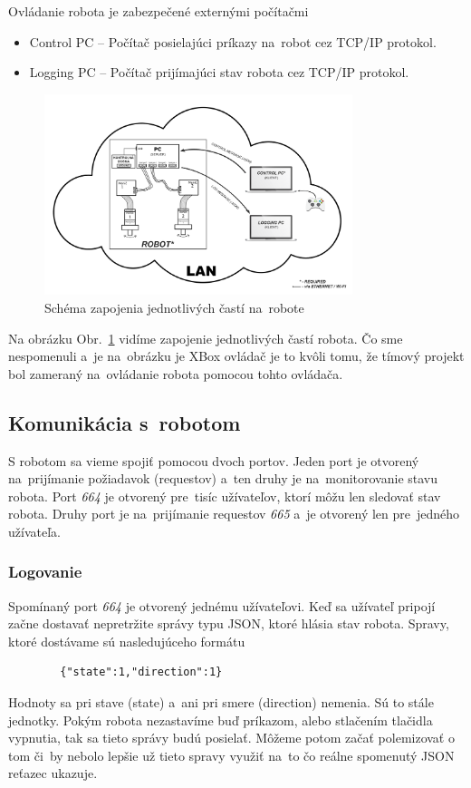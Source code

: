 \noindent Ovládanie robota je zabezpečené externými počítačmi
\begin{itemize}
	\item Control PC -- Počítač posielajúci príkazy na~robot cez TCP/IP protokol.
	\item Logging PC -- Počítač prijímajúci stav robota cez TCP/IP protokol.
\end{itemize}

\begin{figure}[!htbp]
	\begin{center}
		\includegraphics[width=9cm]{img/schemaRobota.png}
	\end{center}
	\caption{Schéma zapojenia jednotlivých častí na~robote}
	\label{fig:schemaRobota}
\end{figure}

Na obrázku Obr.~\ref{fig:schemaRobota} vidíme zapojenie jednotlivých častí robota. Čo sme nespomenuli a~je na~obrázku je XBox ovládač je to kvôli tomu, že
tímový projekt bol zameraný na~ovládanie robota pomocou tohto ovládača.

\subsection{Komunikácia s~robotom}

S robotom sa vieme spojiť pomocou dvoch portov. Jeden port je otvorený na~prijímanie požiadavok (requestov) a~ten druhy je na~monitorovanie stavu robota. 
Port \textit{664} je otvorený pre~tisíc užívateľov, ktorí môžu len sledovať stav robota. Druhy port je na~prijímanie requestov \textit{665} a~je otvorený
len pre~jedného užívateľa.

\subsubsection{Logovanie}

Spomínaný port \textit{664} je otvorený jednému užívateľovi. Keď sa užívateľ pripojí začne dostavať nepretržite správy typu JSON, ktoré hlásia stav robota. Spravy,
ktoré dostávame sú nasledujúceho formátu
\begin{lstlisting}
		{"state":1,"direction":1}
\end{lstlisting}
Hodnoty sa pri stave (state) a~ani pri smere (direction) nemenia. Sú to stále jednotky. Pokým robota nezastavíme buď príkazom, alebo stlačením tlačidla vypnutia,
tak sa tieto správy budú posielať. Môžeme potom začať polemizovať o tom či~by nebolo lepšie už tieto spravy využiť na~to čo reálne spomenutý JSON reťazec ukazuje.

